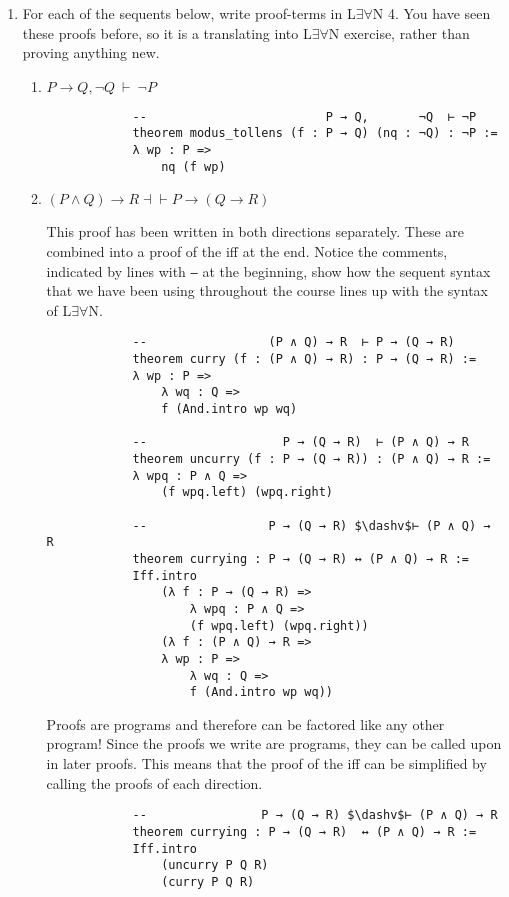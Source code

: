 \documentclass[11pt]{report}
\begin{document}
\begin{enumerate}
	\item For each of the sequents below, write proof-terms in L$\exists\forall$N 4. You have seen these proofs before, so it is a translating into L$\exists\forall$N exercise, rather than proving anything new. 
	 
	\begin{enumerate}

		\item $P \to Q, \lnot Q \ \vdash \ \lnot P$
		
			\begin{lstlisting}
			--                         P → Q,       ¬Q  ⊢ ¬P
			theorem modus_tollens (f : P → Q) (nq : ¬Q) : ¬P :=
			λ wp : P =>
				nq (f wp)
			\end{lstlisting}

		\item $( P\land  Q) \rightarrow  R \dashv\vdash  P\rightarrow ( Q \rightarrow  R) $
		
		This proof has been written in both directions separately. These are combined into a proof of the iff at the end. Notice the comments, indicated by lines with \texttt{---} at the beginning, show how the sequent syntax that we have been using throughout the course lines up with the syntax of L$\exists\forall$N. 
		
			\begin{lstlisting}
			--                 (P ∧ Q) → R  ⊢ P → (Q → R)
			theorem curry (f : (P ∧ Q) → R) : P → (Q → R) :=
			λ wp : P =>
				λ wq : Q =>
				f (And.intro wp wq)
			
			--                   P → (Q → R)  ⊢ (P ∧ Q) → R
			theorem uncurry (f : P → (Q → R)) : (P ∧ Q) → R :=
			λ wpq : P ∧ Q =>
				(f wpq.left) (wpq.right)
			
			--                 P → (Q → R) $\dashv$⊢ (P ∧ Q) → R
			theorem currying : P → (Q → R) ↔ (P ∧ Q) → R :=
			Iff.intro
				(λ f : P → (Q → R) =>
					λ wpq : P ∧ Q =>
					(f wpq.left) (wpq.right))
				(λ f : (P ∧ Q) → R =>
				λ wp : P =>
					λ wq : Q =>
					f (And.intro wp wq))
			\end{lstlisting}

		Proofs are programs and therefore can be factored like any other program! Since the proofs we write are programs, they can be called upon in later proofs. This means that the proof of the iff can be simplified by calling the proofs of each direction. 

			\begin{lstlisting}
			--                P → (Q → R) $\dashv$⊢ (P ∧ Q) → R
			theorem currying : P → (Q → R)  ↔ (P ∧ Q) → R :=
			Iff.intro
				(uncurry P Q R)
				(curry P Q R)
			\end{lstlisting}


\end{enumerate}
\end{enumerate}
\end{document}
